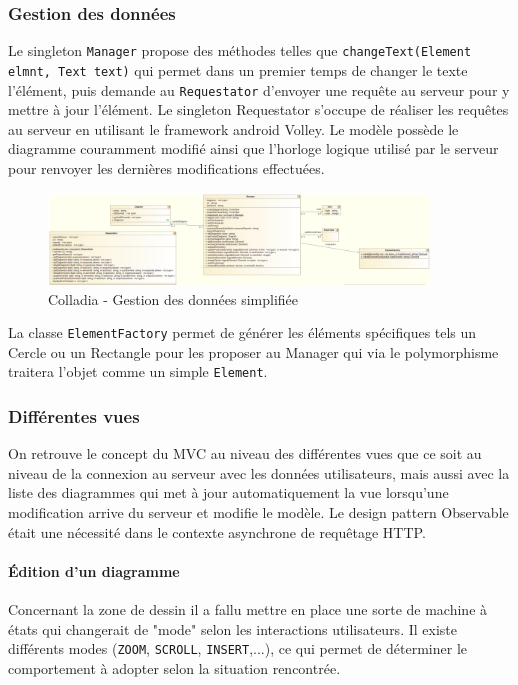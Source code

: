 \subsubsection{Gestion des données}
Le singleton \lstinline$Manager$ propose des méthodes telles que \lstinline$changeText(Element elmnt, Text text)$ qui permet dans un premier temps de changer le texte l'élément, puis demande au \lstinline$Requestator$ d'envoyer une requête au serveur pour y mettre à jour l'élément. Le singleton Requestator s'occupe de réaliser les requêtes au serveur en utilisant le framework android Volley.
Le modèle possède le diagramme couramment modifié ainsi que l'horloge logique utilisé par le serveur pour renvoyer les dernières modifications effectuées.
	\begin{figure}[!h]
		\centering
		\includegraphics[width=0.9\textwidth]{img/UmlArchiGeneral}
		\caption{Colladia - Gestion des données simplifiée}
	\end{figure}
La classe \lstinline$ElementFactory$ permet de générer les éléments spécifiques tels un Cercle ou un Rectangle pour les proposer au Manager qui via le polymorphisme traitera l'objet comme un simple \lstinline$Element$.

\subsubsection{Différentes vues}
On retrouve le concept du MVC au niveau des différentes vues que ce soit au niveau de la connexion au serveur avec les données utilisateurs, mais aussi avec la liste des diagrammes qui met à jour automatiquement la vue lorsqu'une modification arrive du serveur et modifie le modèle. Le design pattern Observable était une nécessité dans le contexte asynchrone de requêtage HTTP.

\paragraph{Édition d'un diagramme}
Concernant la zone de dessin il a fallu mettre en place une sorte de machine à états qui changerait de "mode" selon les interactions utilisateurs. Il existe différents modes (\lstinline$ZOOM$, \lstinline$SCROLL$, \lstinline$INSERT$,...), ce qui permet de déterminer le comportement à adopter selon la situation rencontrée.

